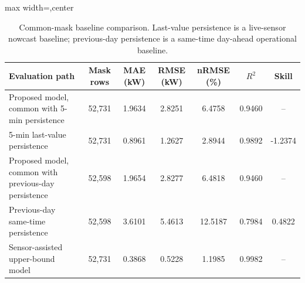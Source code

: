 \begin{table}[!t]
\caption{Common-mask baseline comparison. Last-value persistence is a live-sensor nowcast baseline; previous-day persistence is a same-time day-ahead operational baseline.}
\label{tab:baseline_summary}
\centering
\scriptsize
\setlength{\tabcolsep}{3pt}
\begin{adjustbox}{max width=\textwidth,center}
\begin{tabular}{@{}lcccccc@{}}
\toprule
Evaluation path & Mask rows & MAE (kW) & RMSE (kW) & nRMSE (\%) & $R^2$ & Skill \\
\midrule
Proposed model, common with 5-min persistence & 52,731 & 1.9634 & 2.8251 & 6.4758 & 0.9460 & -- \\
5-min last-value persistence & 52,731 & 0.8961 & 1.2627 & 2.8944 & 0.9892 & -1.2374 \\
Proposed model, common with previous-day persistence & 52,598 & 1.9654 & 2.8277 & 6.4818 & 0.9460 & -- \\
Previous-day same-time persistence & 52,598 & 3.6101 & 5.4613 & 12.5187 & 0.7984 & 0.4822 \\
Sensor-assisted upper-bound model & 52,731 & 0.3868 & 0.5228 & 1.1985 & 0.9982 & -- \\
\bottomrule
\end{tabular}
\end{adjustbox}
\end{table}
